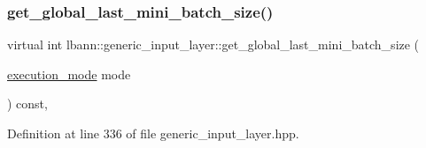 \subsubsection{\texorpdfstring{get\+\_\+global\+\_\+last\+\_\+mini\+\_\+batch\+\_\+size()}{get\_global\_last\_mini\_batch\_size()}}
{\footnotesize\ttfamily virtual int lbann\+::generic\+\_\+input\+\_\+layer\+::get\+\_\+global\+\_\+last\+\_\+mini\+\_\+batch\+\_\+size (\begin{DoxyParamCaption}\item[{\hyperlink{base_8hpp_a2781a159088df64ed7d47cc91c4dc0a8}{execution\+\_\+mode}}]{mode }\end{DoxyParamCaption}) const\hspace{0.3cm}{\ttfamily [inline]}, {\ttfamily [virtual]}}



Definition at line 336 of file generic\+\_\+input\+\_\+layer.\+hpp.


